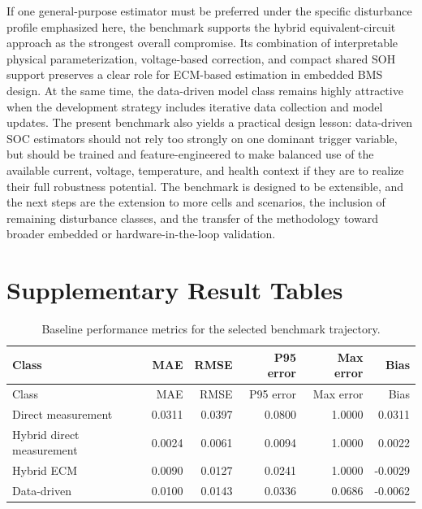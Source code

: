 \documentclass[review,nopreprintline]{elsarticle}
\begin{document}
If one general-purpose estimator must be preferred under the specific disturbance profile emphasized here, the benchmark supports the hybrid equivalent-circuit approach as the strongest overall compromise. Its combination of interpretable physical parameterization, voltage-based correction, and compact shared SOH support preserves a clear role for ECM-based estimation in embedded BMS design. At the same time, the data-driven model class remains highly attractive when the development strategy includes iterative data collection and model updates. The present benchmark also yields a practical design lesson: data-driven SOC estimators should not rely too strongly on one dominant trigger variable, but should be trained and feature-engineered to make balanced use of the available current, voltage, temperature, and health context if they are to realize their full robustness potential. The benchmark is designed to be extensible, and the next steps are the extension to more cells and scenarios, the inclusion of remaining disturbance classes, and the transfer of the methodology toward broader embedded or hardware-in-the-loop validation.

\appendix
\section{Supplementary Result Tables}

\begin{longtable}{lrrrrr}
\caption{Baseline performance metrics for the selected benchmark trajectory.}\label{tab:appendix_baseline_metrics}\\
\toprule
Class & MAE & RMSE & P95 error & Max error & Bias \\
\midrule
\endfirsthead
\toprule
Class & MAE & RMSE & P95 error & Max error & Bias \\
\midrule
\endhead
Direct measurement & 0.0311 & 0.0397 & 0.0800 & 1.0000 & 0.0311 \\
Hybrid direct measurement & 0.0024 & 0.0061 & 0.0094 & 1.0000 & 0.0022 \\
Hybrid ECM & 0.0090 & 0.0127 & 0.0241 & 1.0000 & -0.0029 \\
Data-driven & 0.0100 & 0.0143 & 0.0336 & 0.0686 & -0.0062 \\
\bottomrule
\end{longtable}
\end{document}
